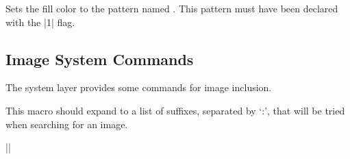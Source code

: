 \begin{command}{\pgfsys@setpatterncolored{}}
  Sets the fill color to the pattern named . This pattern
  must have been declared with the |1| flag.
\end{command}




\subsection{Image System Commands}

The system layer provides some commands for image inclusion.

\begin{command}{\pgfsys@imagesuffixlist}
  This macro should expand to a list of suffixes, separated by `:',
  that will be tried when searching for an image.

  \example |\def\pgfsys@imagesuffixlist{eps:epsi:ps}|
\end{command}


